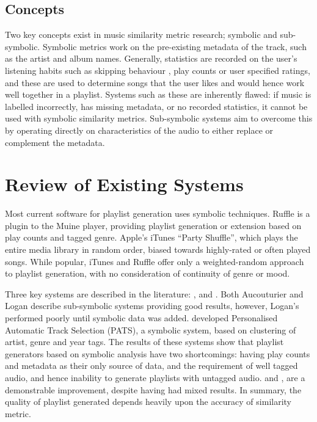 \subsection{Concepts}
Two key concepts exist in music similarity metric research; symbolic and sub-symbolic. Symbolic metrics work on the pre-existing metadata of the track, such as the artist and album names. Generally, statistics are recorded on the user's listening habits such as skipping behaviour \citep{Pampalk2005a}, play counts or user specified ratings, and these are used to determine songs that the user likes and would hence work well together in a playlist. Systems such as these are inherently flawed: if music is labelled incorrectly, has missing metadata, or no recorded statistics, it cannot be used with symbolic similarity metrics. Sub-symbolic systems aim to overcome this by operating directly on characteristics of the audio to either replace or complement the metadata.

\section{Review of Existing Systems}
Most current software for playlist generation uses symbolic techniques. Ruffle is a plugin to the Muine player, providing playlist generation or extension based on play counts and tagged genre. Apple's iTunes ``Party Shuffle'', which plays the entire media library in random order, biased towards highly-rated or often played songs. While popular, iTunes and Ruffle offer only a weighted-random approach to playlist generation, with no consideration of continuity of genre or mood.

Three key systems are described in the literature: \citet{Aucouturier2002a}, \citet{Logan2001} and \citet{Pauws2002}. Both Aucouturier and Logan describe sub-symbolic systems providing good results, however, Logan's performed poorly until symbolic data was added. \citet{Pauws2002} developed Personalised Automatic Track Selection (PATS), a symbolic system, based on clustering of artist, genre and year tags. The results of these systems show that playlist generators based on symbolic analysis have two shortcomings: having play counts and metadata as their only source of data, and the requirement of well tagged audio, and hence inability to generate playlists with untagged  audio. \citet{Aucouturier2002a} and \citet{Logan2001}, are a demonstrable improvement, despite having had mixed results. In summary, the quality of playlist generated depends heavily upon the accuracy of similarity metric.
